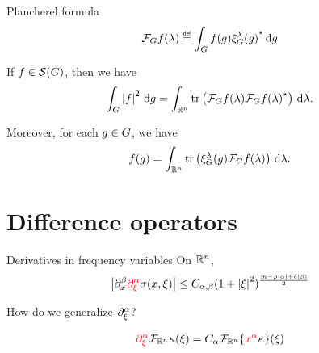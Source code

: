 \documentclass{beamer}
\begin{document}
\begin{frame}{Plancherel formula}
    \begin{align*}
        \Fourier f(\lambda) \defeq \int_\Group f(g) \adj{\Rep \lambda(g)} \dd g
    \end{align*}

    \pause

    \begin{theorem}
        If $f \in {\mathcal{S} (G)}$,
        then we have
        \begin{align*}
            \int_G \left|{f}\right|^2 \,\mathrm{d} g
            = \int_{\mathbb{R}^n} \operatorname{tr} \left(\mathcal{F}_{G} f(\lambda) {\mathcal{F}_{G} f(\lambda)}^\star\right) \,\mathrm{d} \lambda.
        \end{align*}

        Moreover,
        for each $g \in G$, we have
        \begin{align*}
            f(g)
            = \int_{\mathbb{R}^n} \operatorname{tr} \left(\xi^{\lambda}_{G}(g) \mathcal{F}_{G} f(\lambda)\right) \,\mathrm{d} \lambda.
        \end{align*}
    \end{theorem}
\end{frame}

\section{Difference operators}

\begin{frame}{Derivatives in frequency variables}
    On $\mathbb{R}^n$,
    \begin{align*}
        \abs {\iD {x^\beta} {\color{red} \iD {\xi^\alpha}} \sigma(x, \xi)}
        \leq C_{\alpha, \beta} (1 + \abs \xi^2)^{\frac {m - \rho \abs \alpha + \delta \abs \beta} 2}
    \end{align*}

    How do we generalize $\iD {\xi^\alpha}$?

    \pause

    \begin{align*}
        {\color{red} \iD {\xi^\alpha}} \Fourier [\R^n] \kappa(\xi)
        = C_\alpha \Fourier [\R^n] {\{{\color{red} x^\alpha} \kappa\}}(\xi)
    \end{align*}
\end{frame}
\end{document}
